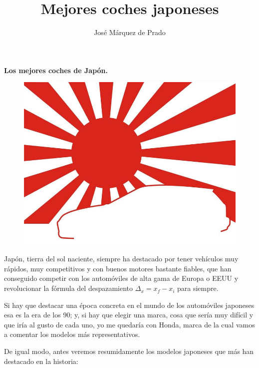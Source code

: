 \documentclass[10pt,a4paper]{report}
\author{José Márquez de Prado}
\title{Mejores coches japoneses}
\begin{document}
\begin{titlepage}
\begin{huge}
\textbf{Los mejores coches de Japón.}
\end{huge}
\begin{figure}
  \begin{center}
    \includegraphics[scale=.45]{Solnaciente.jpg}
  \end{center}
\end{figure}
\end{titlepage}
Japón, tierra del sol naciente, siempre ha destacado por tener vehículos muy rápidos, muy competitivos y con buenos motores bastante fiables, que han conseguido competir con los automóviles de alta gama de Europa o EEUU y revolucionar la fórmula del despazamiento $\Delta_x = x_f - x_i$ para siempre.

Si hay que destacar una época concreta en el mundo de los automóviles japoneses esa es la era de los 90; y, si hay que elegir una marca, cosa que sería muy difícil y que iría al gusto de cada uno, yo me quedaría con Honda, marca de la cual vamos a comentar los modelos más representativos.

De igual modo, antes veremos resumidamente los modelos japoneses que más han destacado en la historia:
\end{document}
